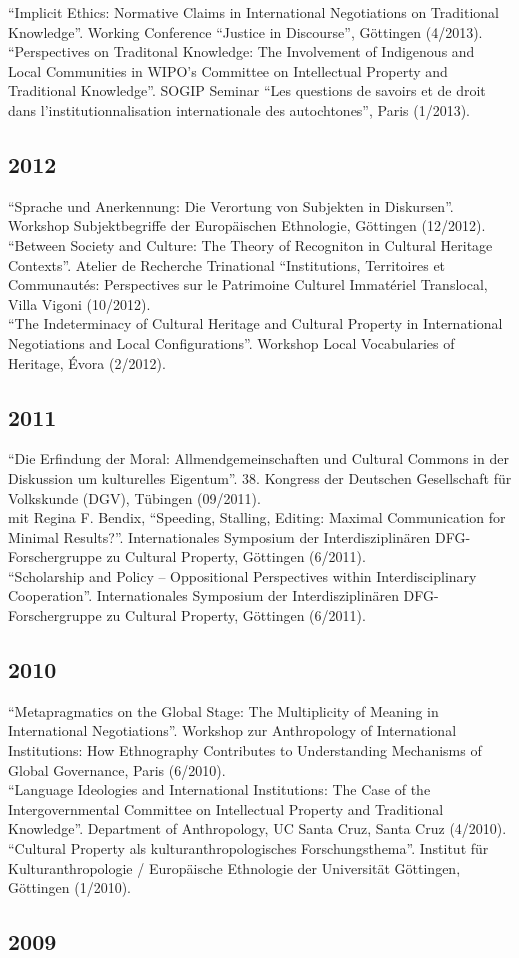 \enquote{Implicit Ethics: Normative Claims in International Negotiations on Traditional Knowledge}. Working Conference “Justice in Discourse”, Göttingen (4/2013).\\[.25cm]\enquote{Perspectives on Traditonal Knowledge: The Involvement of Indigenous and Local Communities in WIPO’s Committee on Intellectual Property and Traditional Knowledge}. SOGIP Seminar “Les questions de savoirs et de droit dans l’institutionnalisation internationale des autochtones”, Paris (1/2013).\subsection*{2012}
\enquote{Sprache und Anerkennung: Die Verortung von Subjekten in Diskursen}. Workshop Subjektbegriffe der Europäischen Ethnologie, Göttingen (12/2012).\\[.25cm]\enquote{Between Society and Culture: The Theory of Recogniton in Cultural Heritage Contexts}. Atelier de Recherche Trinational “Institutions, Territoires et Communautés: Perspectives sur le Patrimoine Culturel Immatériel Translocal, Villa Vigoni (10/2012).\\[.25cm]\enquote{The Indeterminacy of Cultural Heritage and Cultural Property in International Negotiations and Local Configurations}. Workshop Local Vocabularies of Heritage, Évora (2/2012).\subsection*{2011}
\enquote{Die Erfindung der Moral: Allmendgemeinschaften und Cultural Commons in der Diskussion um kulturelles Eigentum}. 38. Kongress der Deutschen Gesellschaft für Volkskunde (DGV), Tübingen (09/2011).\\[.25cm]mit Regina F. Bendix, \enquote{Speeding, Stalling, Editing: Maximal Communication for Minimal Results?}. Internationales Symposium der Interdisziplinären DFG-Forschergruppe zu Cultural Property, Göttingen (6/2011).\\[.25cm]\enquote{Scholarship and Policy – Oppositional Perspectives within Interdisciplinary Cooperation}. Internationales Symposium der Interdisziplinären DFG-Forschergruppe zu Cultural Property, Göttingen (6/2011).\subsection*{2010}
\enquote{Metapragmatics on the Global Stage: The Multiplicity of Meaning in International Negotiations}. Workshop zur Anthropology of International Institutions: How Ethnography Contributes to Understanding Mechanisms of Global Governance, Paris (6/2010).\\[.25cm]\enquote{Language Ideologies and International Institutions: The Case of the Intergovernmental Committee on Intellectual Property and Traditional Knowledge}. Department of Anthropology, UC Santa Cruz, Santa Cruz (4/2010).\\[.25cm]\enquote{Cultural Property als kulturanthropologisches Forschungsthema}. Institut für Kulturanthropologie / Europäische Ethnologie der Universität Göttingen, Göttingen (1/2010).\subsection*{2009}
